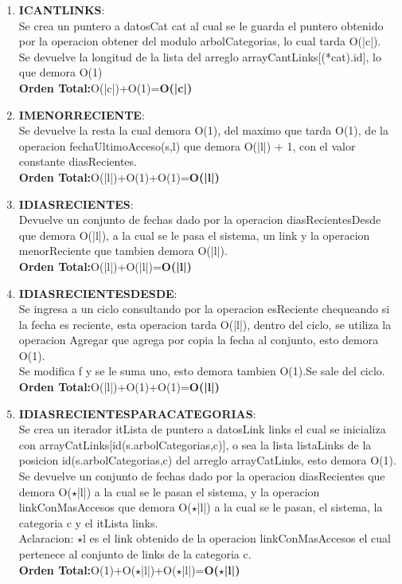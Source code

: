 \documentclass[10pt, a4paper]{article}
\begin{document}
\begin{enumerate}
     \item \textbf{ICANTLINKS}:\\ Se crea un puntero a datosCat cat al cual se le guarda el puntero obtenido por la operacion obtener del modulo arbolCategorias, lo cual tarda O(|c|). \\
Se devuelve la longitud de la lista del arreglo arrayCantLinks[(*cat).id], lo que demora O(1) \\
\textbf{Orden Total:}O(|c|)+O(1)=\textbf{O(|c|)}

      \item \textbf{IMENORRECIENTE}:\\  Se devuelve la resta la cual demora O(1), del maximo que tarda O(1), de la operacion fechaUltimoAcceso(s,l) que demora O(|l|) + 1, con el valor constante diasRecientes. \\
      \textbf{Orden Total:}O(|l|)+O(1)+O(1)=\textbf{O(|l|)}

     \item \textbf{IDIASRECIENTES}:\\ Devuelve un conjunto de fechas dado por la operacion diasRecientesDesde que demora O(|l|), a la cual se le pasa el sistema, un link y la operacion menorReciente que tambien demora O(|l|). \\
\textbf{Orden Total:}O(|l|)+O(|l|)=\textbf{O(|l|)}

     \item \textbf{IDIASRECIENTESDESDE}:\\ Se ingresa a un ciclo consultando por la operacion esReciente chequeando si la fecha es reciente, esta operacion tarda O(|l|), dentro del ciclo, se utiliza la operacion Agregar que agrega por copia la fecha al conjunto, esto demora O(1).\\
Se modifica f y se le suma uno, esto demora tambien O(1).Se sale del ciclo. \\
    \textbf{Orden Total:}O(|l|)+O(1)+O(1)=\textbf{O(|l|)}

      \item \textbf{IDIASRECIENTESPARACATEGORIAS}:\\ Se crea un iterador itLista de puntero a datosLink links el cual se inicializa con arrayCatLinks[id(s.arbolCategorias,c)], o sea la lista listaLinks de la posicion id(s.arbolCategorias,c) del arreglo  arrayCatLinks, esto demora O(1). \\
Se devuelve un conjunto de fechas dado por la operacion diasRecientes que demora O($\star$|l|) a la cual se le pasan el sistema, y la operacion linkConMasAccesos que demora O($\star$|l|) a la cual se le pasan, el sistema, la categoria c y el itLista links.\\
Aclaracion: $\star$l es el link obtenido de la operacion linkConMasAccesos el cual pertenece al conjunto de links de la categoria c. \\
\textbf{Orden Total:}O(1)+O($\star$|l|)+O($\star$|l|)=\textbf{O($\star$|l|)}
      

\end{enumerate}
\end{document}
